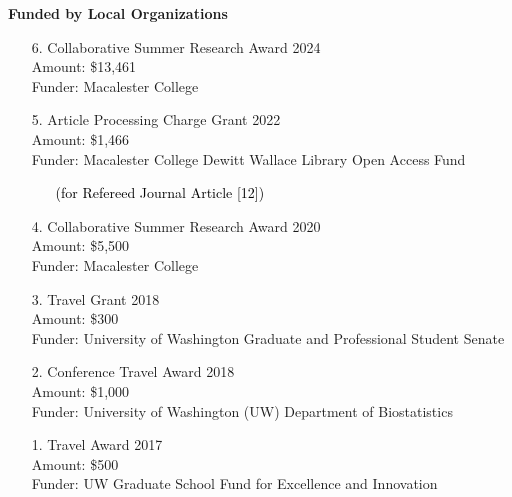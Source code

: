 \documentclass[margin]{res}
\newcommand{\annotateItem}[1]{
	\begin{itemize} \vspace{-0.1cm}
	\item[] 
	\begin{footnotesize}\textcolor{black}{(#1)}\end{footnotesize}
	\end{itemize} \vspace{-0.1cm}
}
\begin{document}
\begin{resume}
\textbf{Funded by Local Organizations} 
\begin{itemize}
\item[6.] Collaborative Summer Research Award \hfill 2024 \\
Amount: \$13,461\\
Funder: Macalester College


\item[5.] Article Processing Charge Grant \hfill 2022 \\ %
Amount: \$1,466 \\
Funder: Macalester College Dewitt Wallace Library Open Access Fund
  \annotateItem{for Refereed Journal Article [12]}
  


\item[4.] Collaborative Summer Research Award  \hfill 2020 \\ %
Amount:  \$5,500 \\
Funder: Macalester College

\item[3.] Travel Grant  \hfill 2018 \\ 
Amount: \$300 \\
Funder: University of Washington Graduate and Professional Student Senate 

\item[2.] Conference Travel Award \hfill 2018 \\
Amount: \$1,000 \\
Funder: University of Washington (UW) Department of Biostatistics

\item[1.] Travel Award \hfill 2017 \\
Amount: \$500 \\
Funder: UW Graduate School Fund for Excellence and Innovation \\
\end{itemize}






\end{resume}
\end{document}

